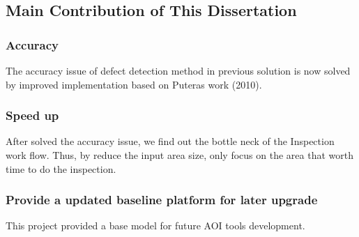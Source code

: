 	\subsection{Main Contribution of This Dissertation}
	\label{subsec:advantages}
		\subsubsection{Accuracy}
			The accuracy issue of defect detection method in previous solution is now solved by improved implementation based on Puteras work 
			\cite{putera2010printed} (2010).


		\subsubsection{Speed up}
			After solved the accuracy issue, we find out the bottle neck of the Inspection work flow. Thus, by reduce the input area size, only focus on the area that worth time to do the inspection.

		\subsubsection{Provide a updated baseline platform for later upgrade}
			This project provided a base model for future AOI tools development.
